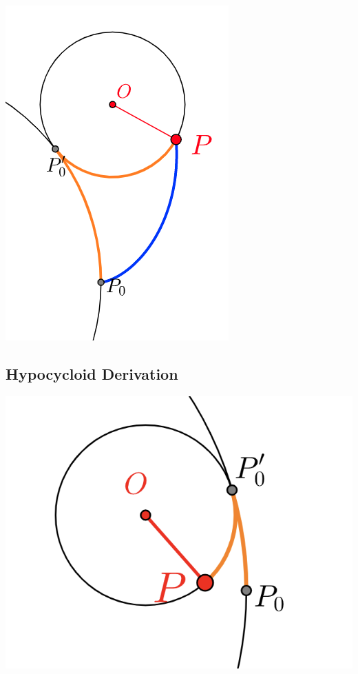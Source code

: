 \begin{center}
    \includegraphics*[scale=0.5]{figures/Screen Shot 2021-02-06 at 9.40.41 AM.png}
\end{center}

\subsection{Hypocycloid Derivation}

\begin{center}
    \includegraphics*[scale=0.6]{figures/Screen Shot 2021-02-06 at 9.58.04 AM.png}
\end{center}

